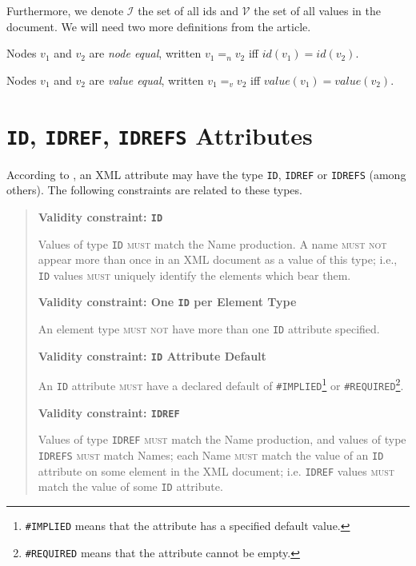 Furthermore, we denote $\mathcal{I}$ the set of all ids and $\mathcal{V}$ the set of all values in the document. We will need two more definitions from the article.

\begin{define}
	Nodes $v_1$ and $v_2$ are \textit{node equal}, written $v_1 =_n v_2$ iff $id(v_1) = id(v_2)$.
\end{define}

\begin{define}
	Nodes $v_1$ and $v_2$ are \textit{value equal}, written $v_1 =_v v_2$ iff $value(v_1) = value(v_2)$.
\end{define}

\section{\texttt{ID}, \texttt{IDREF}, \texttt{IDREFS} Attributes}
\label{section-definitions-id-attributes}

According to \cite{Bray:08:EML}, an XML attribute may have the type \texttt{ID}, \texttt{IDREF} or \texttt{IDREFS} (among others). The following constraints are related to these types.

\begin{quote}
\textbf{Validity constraint: \texttt{ID}}

Values of type \texttt{ID} \textsc{must} match the Name production. A name \textsc{must not} appear more than once in an XML document as a value of this type; i.e., \texttt{ID} values \textsc{must} uniquely identify the elements which bear them.

\textbf{Validity constraint: One \texttt{ID} per Element Type}

An element type \textsc{must not} have more than one \texttt{ID} attribute specified.

\textbf{Validity constraint: \texttt{ID} Attribute Default}

An \texttt{ID} attribute \textsc{must} have a declared default of \texttt{\#IMPLIED}\footnote{\texttt{\#IMPLIED} means that the attribute has a specified default value.} or \texttt{\#RE\-QUIRED}\footnote{\texttt{\#REQUIRED} means that the attribute cannot be empty.}.

\textbf{Validity constraint: \texttt{IDREF}}

Values of type \texttt{IDREF} \textsc{must} match the Name production, and values of type \texttt{IDREFS} \textsc{must} match Names; each Name \textsc{must} match the value of an \texttt{ID} attribute on some element in the XML document; i.e. \texttt{IDREF} values \textsc{must} match the value of some \texttt{ID} attribute.
\end{quote}

